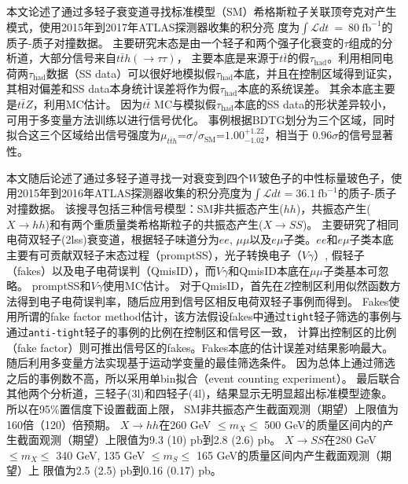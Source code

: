 本文论述了通过多轻子衰变道寻找标准模型（SM）希格斯粒子关联顶夸克对产生模式，使用2015年到2017年ATLAS探测器收集的积分亮
度为$\int \mathcal{L}dt~=~80~\text{fb}^{-1}$的质子-质子对撞数据。
主要研究末态是由一个轻子和两个强子化衰变的$\tau$组成的分析道\ltwotau ，大部分信号来自$t\bar{t}h(\rightarrow \tau\tau)$，
主要本底是来源于$t\bar{t}$的假$\tau_{\text{had}}$。利用相同电荷两$\tau_{\text{had}}$数据（SS data）可以很好地模拟假$\tau_{\text{had}}$本底，并且在控制区域得到证实，
其相对偏差和SS data本身统计误差将作为假$\tau_{\text{had}}$本底的系统误差。
其余本底主要是$t\bar{t}Z$，利用MC估计。
因为$t\bar{t}$ MC与模拟假$\tau_{\text{had}}$本底的SS data的形状差异较小，可用于多变量方法训练以进行信号优化。
事例根据BDTG划分为三个区域，同时拟合这三个区域给出信号强度为$\mu_{t\bar{t}h}$=$\sigma/\sigma_{\text{SM}}$=$1.00^{+1.22}_{-1.02}$，相当于
$0.96\sigma$的信号显著性。

本文随后论述了通过多轻子道寻找一对衰变到四个$W$玻色子的中性标量玻色子，使用2015年到2016年ATLAS探测器收集的积分亮度为$\int \mathcal{L}dt=36.1~\text{fb}^{-1}$的质子-质子对撞数据。
该搜寻包括三种信号模型：SM非共振态产生($hh$)，共振态产生($X\rightarrow hh$)和有两个重质量类希格斯粒子的共振态产生($X\rightarrow SS$)。
主要研究了相同电荷双轻子(2lss)衰变道，根据轻子味道分为$ee$, $\mu\mu$以及$e\mu$子类。$ee$和$e\mu$子类本底主要有可贡献双轻子末态过程（promptSS），光子转换电子（$V\gamma$）,
假轻子（fakes）以及电子电荷误判（QmisID），而$V\gamma$和QmisID本底在$\mu\mu$子类基本可忽略。
promptSS和$V\gamma$使用MC估计。
对于QmisID，首先在$Z$控制区利用似然函数方法得到电子电荷误判率，随后应用到信号区相反电荷双轻子事例而得到。
Fakes使用所谓的fake factor method估计，该方法假设fakes中通过\texttt{tight}轻子筛选的事例与通过\texttt{anti-tight}轻子的事例的比例在控制区和信号区一致，
计算出控制区的比例（fake factor）则可推出信号区的fakes。Fakes本底的估计误差对结果影响最大。
随后利用多变量方法实现基于运动学变量的最佳筛选条件。
因为总体上通过筛选之后的事例数不高，所以采用单bin拟合（event counting experiment）。
最后联合其他两个分析道，三轻子(3l)和四轻子(4l)，结果显示无明显超出标准模型迹象。
所以在95\%置信度下设置截面上限，
SM非共振态产生截面观测（期望）上限值为160倍（120）倍预期。
$X\rightarrow hh$在260 GeV $\leq m_X\leq$ 500 GeV的质量区间内的产生截面观测（期望）上限值为9.3 (10) pb到2.8 (2.6) pb。
$X\rightarrow SS$在280 GeV $\leq m_X\leq$ 340 GeV, 135 GeV $\leq m_S\leq$ 165 GeV的质量区间内产生截面观测（期望）上
限值为2.5 (2.5) pb到0.16 (0.17) pb。

